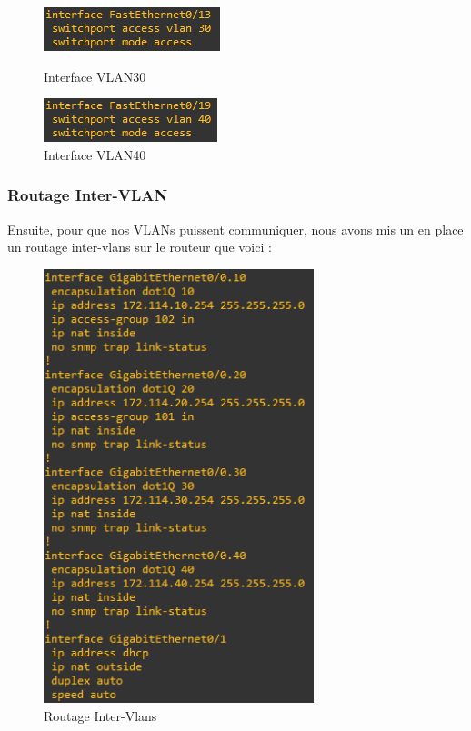 \documentclass[12pt, a4paper]{article}
\begin{document}
		\begin{figure}[h]
			\begin{minipage}[c]{.46\linewidth}
				\centering
				\includegraphics{screens/SW/Interface-VLAN30.png}
				\caption{Interface VLAN30}
			\end{minipage}
			\hfill%
			\begin{minipage}[c]{.46\linewidth}
				\centering
				\includegraphics{screens/SW/Interface-VLAN40.png}
				\caption{Interface VLAN40}
			\end{minipage}
		\end{figure}
		\newpage

		\subsubsection{Routage Inter-VLAN}
		Ensuite, pour que nos VLANs puissent communiquer, nous avons mis un
		en place un routage inter-vlans sur le routeur que voici :\\
		\begin{figure}[H]
			\centering
			\includegraphics[width=0.7\textwidth]{screens/routeur/interface.png}
			\caption{Routage Inter-Vlans}
			\label{fig:intervlan}
		\end{figure}
\end{document}
